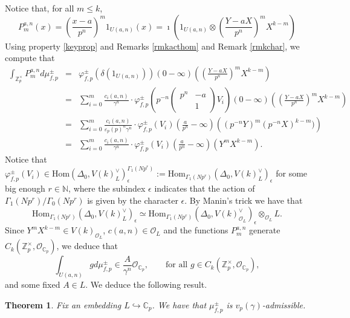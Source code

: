 \documentclass{amsart}
\newtheorem{thm0}[defn0]{Theorem}
\newtheorem{remark0}[defn0]{Remark}
\newenvironment{theorem}{\begin{thm0}}{\end{thm0}}
\newenvironment{remark}{\begin{remark0}\rm}{\end{remark0}}
\newcommand{\Z}{{\mathbb Z}}
\newcommand{\Q}{{\mathbb Q}}
\newcommand{\C}{{\mathbb C}}
\newcommand{\N}{{\mathbb N}}
\newcommand{\cO}{{\mathcal O}}
\newcommand{\Hom}{{\mathrm {Hom}}}
\begin{document}
Notice that, for all $m\leq k$,
\[
P_m^{a,n}(x)=\left(\frac{x-a}{p^n}\right)^m1_{U(a,n)}(x)=\imath\left(1_{U(a,n)}\otimes\left(\frac{Y-aX}{p^n}\right)^mX^{k-m}\right)
\]
Using property \eqref{keyprop} and Remarks \ref{rmkacthom} and Remark \ref{rmkchar}, we compute that 
\begin{eqnarray*}
\int_{\Z_p^\times}P_m^{a,n} d\mu^\pm_{f,p}&=&\varphi_{f,p}^\pm(\delta(1_{U(a,n)}))(0-\infty)\left(\left(\frac{Y-aX}{p^n}\right)^mX^{k-m}\right)\\
&=&\sum_{i=0}^m\frac{c_i(a,n)}{\gamma^n}\cdot\varphi_{f,p}^\pm\left(p^{-n}\left(\begin{smallmatrix}p^n&-a\\&1\end{smallmatrix}\right)V_i\right)(0-\infty)\left(\left(\frac{Y-aX}{p^n}\right)^mX^{k-m}\right)\\
&=&\sum_{i=0}^m\frac{c_i(a,n)}{\varepsilon_p(p)^{n}\gamma^n}\cdot\varphi^\pm_{f,p}(V_i)\left(\frac{a}{p^n}-\infty\right)\left((p^{-n}Y)^m(p^{-n}X)^{k-m})\right)\\
&=&\sum_{i=0}^m\frac{c_i(a,n)}{\gamma^n}\cdot\varphi^\pm_{f,p}(V_i)\left(\frac{a}{p^n}-\infty\right)\left(Y^mX^{k-m}\right).
\end{eqnarray*}
Notice that $\varphi^\pm_{f,p}(V_i)\in \Hom(\Delta_0,V(k)_L^\vee)^{\Gamma_1(Np^r)}_\epsilon:=\Hom_{\Gamma_1(Np^r)}(\Delta_0,V(k)_L^\vee)_\epsilon$ for some big enough $r\in\N$, where the subindex $\epsilon$ indicates that the action of $\Gamma_1(Np^r)/\Gamma_0(Np^r)$ is given by the character $\epsilon$. By Manin's trick we have that 
\[
\Hom_{\Gamma_1(Np^r)}(\Delta_0,V(k)_L^\vee)_\epsilon\simeq\Hom_{\Gamma_1(Np^r)}(\Delta_0,V(k)_{\cO_L}^\vee)_\epsilon\otimes_{\cO_L} L.
\]
Since $Y^mX^{k-m}\in V(k)_{\cO_L}$, $c(a,n)\in\cO_L$ and the functions $P_m^{a,n}$ generate $C_k(\Z_p^\times,\cO_{\C_p})$, we deduce that 
\begin{equation}\label{calcint}
\int_{U(a,n)}gd\mu^\pm_{f,p}\in\frac{A}{\gamma^n}\cO_{\C_p},\qquad\mbox{for all }g\in C_k(\Z_p^\times,\cO_{\C_p}),
\end{equation}
and some fixed $A\in L$.
We deduce the following result.
\begin{theorem}\label{thmadm}
Fix an embedding $L\hookrightarrow\C_p$. We have that $\mu^\pm_{f,p}$ is $v_p(\gamma)$-admissible. %
\end{theorem}

\end{document}
